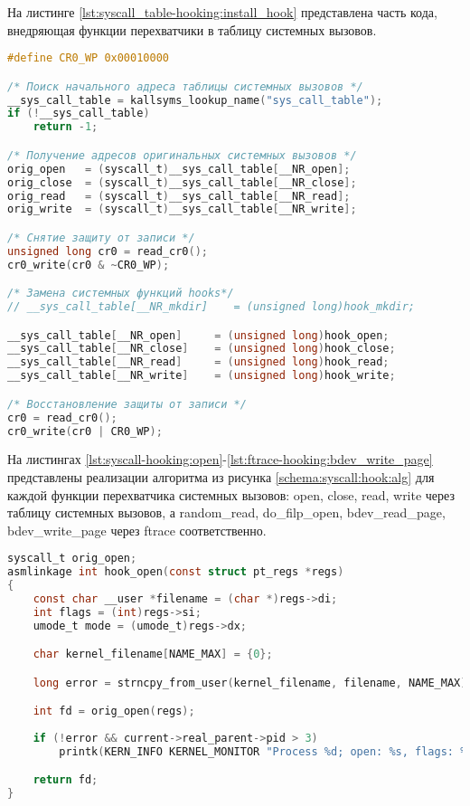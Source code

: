     На листинге \ref{lst:syscall_table-hooking:install_hook} представлена часть кода,
    внедряющая функции перехватчики в таблицу системных вызовов.
    \begin{lstlisting}[language=C, label=lst:syscall_table-hooking:install_hook, caption=Внедрение функций перехватчиков в таблицу системных вызовов]
#define CR0_WP 0x00010000

/* Поиск начального адреса таблицы системных вызовов */
__sys_call_table = kallsyms_lookup_name("sys_call_table");
if (!__sys_call_table)
    return -1;

/* Получение адресов оригинальных системных вызовов */
orig_open   = (syscall_t)__sys_call_table[__NR_open];
orig_close  = (syscall_t)__sys_call_table[__NR_close];
orig_read   = (syscall_t)__sys_call_table[__NR_read];
orig_write  = (syscall_t)__sys_call_table[__NR_write];

/* Снятие защиту от записи */
unsigned long cr0 = read_cr0();
cr0_write(cr0 & ~CR0_WP);

/* Замена системных функций hooks*/
// __sys_call_table[__NR_mkdir]    = (unsigned long)hook_mkdir;

__sys_call_table[__NR_open]     = (unsigned long)hook_open;
__sys_call_table[__NR_close]    = (unsigned long)hook_close;
__sys_call_table[__NR_read]     = (unsigned long)hook_read;
__sys_call_table[__NR_write]    = (unsigned long)hook_write;

/* Восстановление защиты от записи */
cr0 = read_cr0();
cr0_write(cr0 | CR0_WP);
    \end{lstlisting}
        

    На листингах \ref{lst:syscall-hooking:open}-\ref{lst:ftrace-hooking:bdev_write_page} 
    представлены реализации алгоритма из рисунка \ref{schema:syscall:hook:alg} 
    для каждой функции перехватчика системных вызовов:
    open, close, read, write через таблицу системных вызовов,
    а random\_read, do\_filp\_open, bdev\_read\_page, bdev\_write\_page через ftrace соответственно.

    \begin{lstlisting}[language=C, label=lst:syscall-hooking:open, caption=Функция-обёртка системного вызова open]
syscall_t orig_open;
asmlinkage int hook_open(const struct pt_regs *regs)
{
    const char __user *filename = (char *)regs->di;
    int flags = (int)regs->si;
    umode_t mode = (umode_t)regs->dx;

    char kernel_filename[NAME_MAX] = {0};

    long error = strncpy_from_user(kernel_filename, filename, NAME_MAX);

    int fd = orig_open(regs);
        
    if (!error && current->real_parent->pid > 3)
        printk(KERN_INFO KERNEL_MONITOR "Process %d; open: %s, flags: %x; mode: %x; fd: %d\n", current->pid, kernel_filename, flags, mode, fd);

    return fd;
}
    \end{lstlisting}

